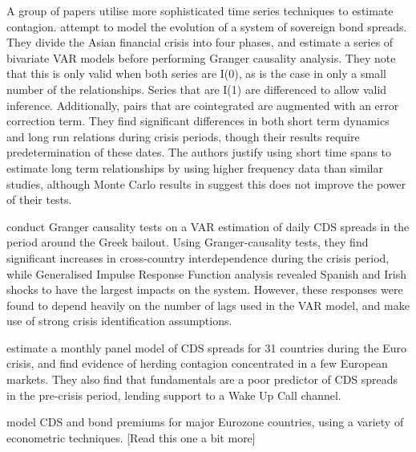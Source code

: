 \documentclass[../base.tex]{subfiles}
\begin{document}
A group of papers utilise more sophisticated time series techniques to estimate contagion. \cite{sander2003contagion} attempt to model the evolution of a system of sovereign bond spreads. They divide the Asian financial crisis into four phases, and estimate a series of bivariate VAR models before performing Granger causality analysis. They note that this is only valid when both series are I(0), as is the case in only a small number of the relationships. Series that are I(1) are differenced to allow valid inference. Additionally, pairs that are cointegrated are augmented with an error correction term. They find significant differences in both short term dynamics and long run relations during crisis periods, though their results require predetermination of these dates. The authors justify using short time spans to estimate long term relationships by using higher frequency data than similar studies, although Monte Carlo results in \cite{pierse1995temporal} suggest this does not improve the power of their tests.

\cite{kalbaska2012eurozone} conduct Granger causality tests on a VAR estimation of daily CDS spreads in the period around the Greek bailout. Using Granger-causality tests, they find significant increases in cross-country interdependence during the crisis period, while Generalised Impulse Response Function analysis revealed Spanish and Irish shocks to have the largest impacts on the system. However, these responses were found to depend heavily on the number of lags used in the VAR model, and make use of strong crisis identification assumptions.

\cite{beirne2013pricing} estimate a monthly panel model of CDS spreads for 31 countries during the Euro crisis, and find evidence of herding contagion concentrated in a few European markets. They also find that fundamentals are a poor predictor of CDS spreads in the pre-crisis period, lending support to a Wake Up Call channel.

\cite{caporin2013measuring} model CDS and bond premiums for major Eurozone countries, using a variety of econometric techniques. [Read this one a bit more]
\end{document}
